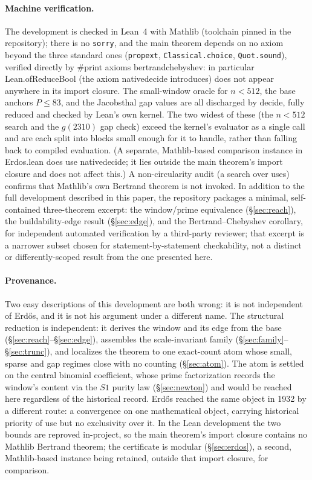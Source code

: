 \documentclass[11pt,a4paper]{amsart}
\theoremstyle{plain}
\theoremstyle{definition}
\theoremstyle{plain}
\theoremstyle{remark}
\newcommand{\lean}[1]{\begingroup\upshape\ttfamily\def\_{\textunderscore\allowbreak}#1\endgroup}
\begin{document}
\paragraph{Machine verification.}
The development is checked in Lean~4 with Mathlib (toolchain pinned in the repository);
there is no \texttt{sorry}, and the main theorem depends on no axiom beyond the three
standard ones (\texttt{propext}, \texttt{Classical.choice}, \texttt{Quot.sound}), verified
directly by \lean{\#print axioms bertrand\_chebyshev}: in particular
\lean{Lean.ofReduceBool} (the axiom \lean{native\_decide} introduces) does not appear
anywhere in its import closure. The small-window oracle for $n<512$, the base anchors
$P\le83$, and the Jacobsthal gap values are all discharged by \lean{decide}, fully reduced
and checked by Lean's own kernel. The two widest of these (the $n<512$ search and the
$g(2310)$ gap check) exceed the kernel's evaluator as a single call and are each split
into blocks small enough for it to handle, rather than falling back to compiled evaluation.
(A separate, Mathlib-based comparison instance in \lean{Erdos.lean} does use
\lean{native\_decide}; it lies outside the main theorem's import closure and does not affect
this.) A non-circularity audit (a search over uses) confirms that Mathlib's own Bertrand
theorem is not invoked. In addition to the full development described in this paper, the
repository packages a minimal, self-contained three-theorem excerpt: the window/prime
equivalence (\S\ref{sec:reach}), the buildability-edge result (\S\ref{sec:edge}), and the
Bertrand--Chebyshev corollary, for independent automated verification by a third-party
reviewer; that excerpt is a narrower subset chosen for statement-by-statement checkability,
not a distinct or differently-scoped result from the one presented here.

\paragraph{Provenance.}
Two easy descriptions of this development are both wrong: it is not independent of
Erd\H{o}s, and it is not his argument under a different name. The structural reduction
is independent: it derives the window and its edge from the base
(\S\ref{sec:reach}--\S\ref{sec:edge}), assembles the scale-invariant family
(\S\ref{sec:family}--\S\ref{sec:trunc}), and localizes the theorem to one exact-count atom
whose small, sparse and gap regimes close with no counting (\S\ref{sec:atom}). The atom is
settled on the central binomial coefficient, whose prime factorization records the window's
content via the $S1$ purity law (\S\ref{sec:newton}) and would be reached here regardless of
the historical record. Erd\H{o}s reached the same object in 1932 by a different route: a
convergence on one mathematical object, carrying historical priority of use but no exclusivity
over it. In the Lean development the two bounds are reproved in-project, so the main theorem's
import closure contains no Mathlib Bertrand theorem; the certificate is modular
(\S\ref{sec:erdos}), a second, Mathlib-based instance being retained, outside that import
closure, for comparison.
\end{document}
